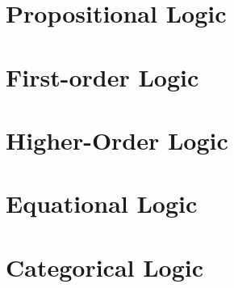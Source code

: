 \section{Propositional Logic}

\section{First-order Logic}


\section{Higher-Order Logic}

\section{Equational Logic}


\section{Categorical Logic}


